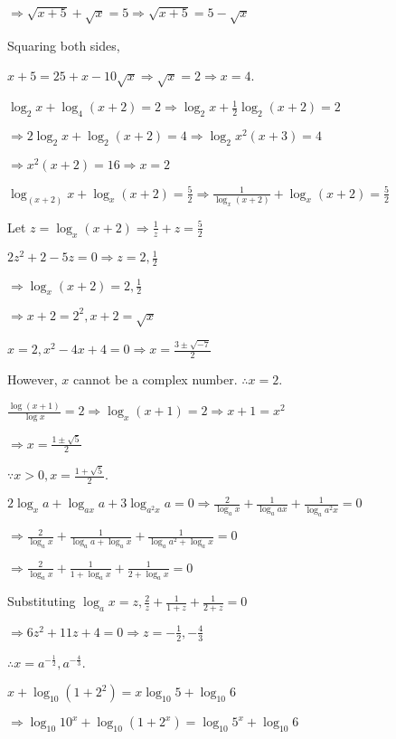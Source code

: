   $\Rightarrow \sqrt{x + 5} + \sqrt{x} = 5 \Rightarrow \sqrt{x + 5} = 5 - \sqrt{x}$

  Squaring both sides,

  $x + 5 = 25 + x - 10\sqrt{x}\Rightarrow \sqrt{x} = 2\Rightarrow x = 4$.
\item $\log_2x + \log_4(x + 2) = 2 \Rightarrow \log_2x + \frac{1}{2}\log_2(x + 2) = 2$

  $\Rightarrow 2\log_2x + \log_2(x + 2) = 4 \Rightarrow \log_2x^2(x + 3) = 4$

  $\Rightarrow x^2(x + 2) = 16 \Rightarrow x = 2$
\item $\log_{(x + 2)}x + \log_x(x + 2) = \frac{5}{2} \Rightarrow \frac{1}{\log_x(x + 2)} + \log_x(x + 2) = \frac{5}{2}$

  Let $z = \log_x(x + 2) \Rightarrow \frac{1}{z} + z = \frac{5}{2}$

  $2z^2 + 2 - 5z = 0 \Rightarrow z = 2, \frac{1}{2}$

  $\Rightarrow \log_x(x + 2) = 2, \frac{1}{2}$

  $\Rightarrow x + 2 = 2^2, x + 2 = \sqrt{x}$

  $x = 2, x^2 - 4x + 4 = 0 \Rightarrow x = \frac{3\pm\sqrt{-7}}{2}$

  However, $x$ cannot be a complex number. $\therefore x = 2$.
\item $\frac{\log(x + 1)}{\log x} = 2\Rightarrow \log_x(x + 1) = 2 \Rightarrow x + 1 = x^2$

  $\Rightarrow x = \frac{1\pm \sqrt{5}}{2}$

  $\because x > 0, x = \frac{1 + \sqrt{5}}{2}$.
\item $2\log_xa + \log_{ax}a + 3\log_{a^2x}a = 0 \Rightarrow \frac{2}{\log_ax} + \frac{1}{\log_aax} + \frac{1}{\log_aa^2x} = 0$

  $\Rightarrow \frac{2}{\log_ax} + \frac{1}{\log_aa + \log_ax} + \frac{1}{\log_aa^2 + \log_ax} = 0$

  $\Rightarrow \frac{2}{\log_ax} + \frac{1}{1 + \log_ax} + \frac{1}{2 + \log_ax} = 0$

  Substituting $\log_ax = z, \frac{2}{z} + \frac{1}{1 + z} + \frac{1}{2 + z} = 0$

  $\Rightarrow 6z^2 + 11z + 4 = 0 \Rightarrow z = -\frac{1}{2}, -\frac{4}{3}$

  $\therefore x = a^{-\tfrac{1}{2}}, a^{-\tfrac{4}{3}}$.
\item $x + \log_{10}(1 + 2^2) = x\log_{10}5 + \log_{10}6$

  $\Rightarrow \log_{10}10^x + \log_{10}(1 + 2^x) = \log_{10}5^x + \log_{10}6$


